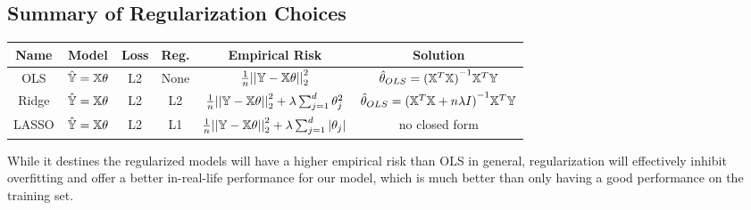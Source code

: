 \subsection{Summary of Regularization Choices}
\begin{center}
    \begin{tabular}{c|ccc|c|c}
        Name & Model & Loss & Reg. & Empirical Risk & Solution \\
        \hline
        OLS & $\hat{\mathbb{Y}} = \mathbb{X} \theta$ & L2 & None & $\frac{1}{n}{||\mathbb{Y} - \mathbb{X} \theta||}_2^2$ & $\hat{\theta}_{OLS} = {(\mathbb{X}^T \mathbb{X})}^{-1} \mathbb{X}^T \mathbb{Y}$ \\
        Ridge & $\hat{\mathbb{Y}} = \mathbb{X} \theta$ & L2 & L2 & $\frac{1}{n}{||\mathbb{Y} - \mathbb{X} \theta||}_2^2 + \lambda \sum_{j = 1}^d \theta_j^2$ & $\hat{\theta}_{OLS} = {(\mathbb{X}^T \mathbb{X} + n\lambda I)}^{-1} \mathbb{X}^T \mathbb{Y}$ \\
        LASSO & $\hat{\mathbb{Y}} = \mathbb{X} \theta$ & L2 & L1 & $\frac{1}{n}{||\mathbb{Y} - \mathbb{X} \theta||}_2^2 + \lambda \sum_{j = 1}^d |\theta_j|$ & no closed form
    \end{tabular}
\end{center}
While it destines the regularized models will have a higher empirical risk than OLS in general, regularization will effectively inhibit overfitting and offer a better in-real-life performance for our model, which is much better than only having a good performance on the training set.
